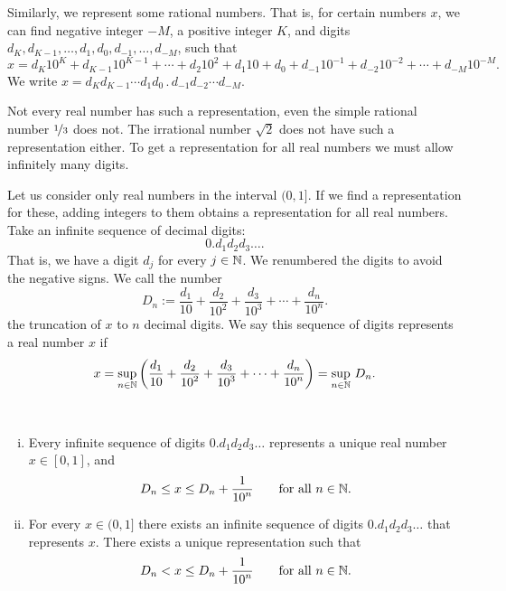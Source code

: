 Similarly, we
represent some rational numbers.  That is, for certain
numbers $x$, we can find
negative integer $-M$, a positive integer $K$, and digits
$d_K,d_{K-1},\ldots,d_1,d_0,d_{-1},\ldots,d_{-M}$, such that
\begin{equation*}
x = d_K {10}^K + d_{K-1} {10}^{K-1} + \cdots + d_2 {10}^2 + d_1 10 + d_0 
+ d_{-1} {10}^{-1} + d_{-2} {10}^{-2} + \cdots + d_{-M} {10}^{-M} .
\end{equation*}
We write $x = d_K d_{K-1} \cdots d_1 d_0 \, . \, d_{-1} d_{-2} \cdots d_{-M}$.

Not every real number has such a representation, even the simple
rational number $\nicefrac{1}{3}$ does not.  The irrational number $\sqrt{2}$ 
does not have such a representation either.  To get a representation for
all real numbers we must allow infinitely many digits.

Let us consider only real numbers in the interval $(0,1]$.  If
we find a representation for these, adding 
integers to them obtains a representation for all real numbers.
Take an infinite sequence of decimal digits:
\begin{equation*}
0.d_1d_2d_3\ldots.
\end{equation*}
That is, we have a digit $d_j$ for every $j \in {\mathbb{N}}$.
We renumbered the digits to avoid the negative signs.
We call the number
\begin{equation*}
D_n := 
\frac{d_1}{10} + 
\frac{d_2}{{10}^2} + 
\frac{d_3}{{10}^3} + 
\cdots +
\frac{d_n}{{10}^n} .
\end{equation*}
the truncation of $x$ to $n$ decimal digits.
We say this
sequence of digits represents a real number $x$ if
\begin{equation*}
x =
\sup_{n \in {\mathbb{N}}} \left(
\frac{d_1}{10} + 
\frac{d_2}{{10}^2} + 
\frac{d_3}{{10}^3} + 
\cdots +
\frac{d_n}{{10}^n}
\right) =
\sup_{n \in {\mathbb{N}}} \, D_n .
\end{equation*}

\begin{prop} \label{prop:decimalprop}
{~}
\begin{enumerate}[(i)]
\item
Every infinite sequence of digits
$0.d_1d_2d_3\ldots$ represents a unique real number $x \in [0,1]$, and
\begin{equation*}
D_n \leq x \leq D_n+\frac{1}{{10}^n} \qquad \text{for all } n \in {\mathbb{N}}.
\end{equation*}
\item
For every $x \in (0,1]$ there exists an infinite sequence of digits
$0.d_1d_2d_3\ldots$ that represents $x$.
There exists a unique representation such that
\begin{equation*}
D_n < x \leq D_n+\frac{1}{{10}^n} \qquad \text{for all } n \in {\mathbb{N}}.
\end{equation*}
\end{enumerate}
\end{prop}

